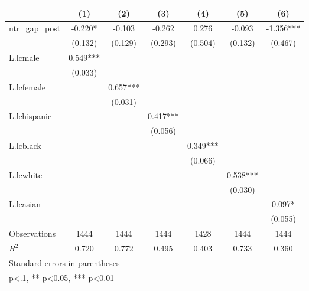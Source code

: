 {
\def\sym#1{\ifmmode^{#1}\else\(^{#1}\)\fi}
\begin{tabular}{l*{6}{c}}
\toprule
                    &\multicolumn{1}{c}{(1)}   &\multicolumn{1}{c}{(2)}   &\multicolumn{1}{c}{(3)}   &\multicolumn{1}{c}{(4)}   &\multicolumn{1}{c}{(5)}   &\multicolumn{1}{c}{(6)}   \\
\midrule
ntr\_gap\_post        &   -0.220*  &   -0.103   &   -0.262   &    0.276   &   -0.093   &   -1.356***\\
                    &  (0.132)   &  (0.129)   &  (0.293)   &  (0.504)   &  (0.132)   &  (0.467)   \\
\addlinespace
L.lcmale            &    0.549***&            &            &            &            &            \\
                    &  (0.033)   &            &            &            &            &            \\
\addlinespace
L.lcfemale          &            &    0.657***&            &            &            &            \\
                    &            &  (0.031)   &            &            &            &            \\
\addlinespace
L.lchispanic        &            &            &    0.417***&            &            &            \\
                    &            &            &  (0.056)   &            &            &            \\
\addlinespace
L.lcblack           &            &            &            &    0.349***&            &            \\
                    &            &            &            &  (0.066)   &            &            \\
\addlinespace
L.lcwhite           &            &            &            &            &    0.538***&            \\
                    &            &            &            &            &  (0.030)   &            \\
\addlinespace
L.lcasian           &            &            &            &            &            &    0.097*  \\
                    &            &            &            &            &            &  (0.055)   \\
\midrule
Observations        &     1444   &     1444   &     1444   &     1428   &     1444   &     1444   \\
\(R^{2}\)           &    0.720   &    0.772   &    0.495   &    0.403   &    0.733   &    0.360   \\
\bottomrule
\multicolumn{7}{l}{\footnotesize Standard errors in parentheses}\\
\multicolumn{7}{l}{\footnotesize * p<.1, ** p<0.05, *** p<0.01}\\
\end{tabular}
}
